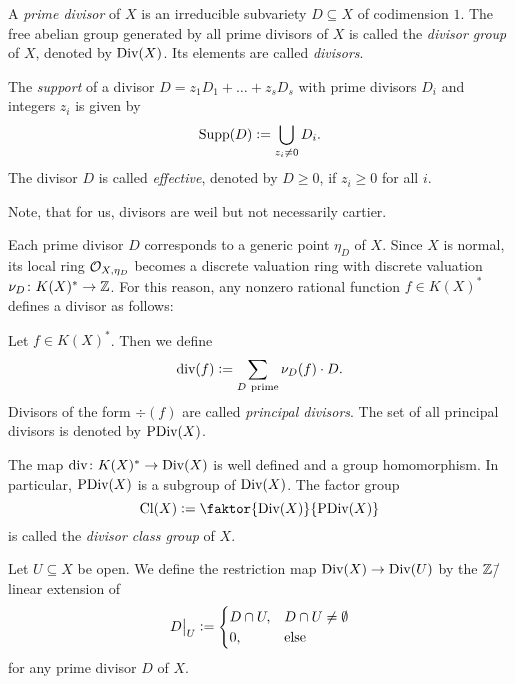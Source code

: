 \begin{defi}[Divisor]
	A \emph{prime divisor} of $X$ is an irreducible subvariety $D\subseteq X$ of codimension $1$. The free abelian group generated by all prime divisors of $X$ is called the \emph{divisor group} of $X$, denoted by $\text{Div}(X)$. Its elements are called \emph{divisors}.
	
	The \emph{support} of a divisor $D = z_1 D_1 + \dots + z_s D_s$ with prime divisors $D_i$ and integers $z_i$ is given by
	$$\text{Supp}(D) \mathrel{\mathop:}= \bigcup_{z_i \neq 0} D_i.$$
	The divisor $D$ is called \emph{effective}, denoted by $D \geq 0$, if $z_i \geq 0 $ for all $i$.
\end{defi}

Note, that for us, divisors are weil but not necessarily cartier.

Each prime divisor $D$ corresponds to a generic point $\eta_D$ of $X$. Since $X$ is normal, its local ring $\mathcal{O}_{X,\eta_D}$ becomes a discrete valuation ring with discrete valuation $\nu_D\colon K(X)^* \rightarrow \mathbb{Z}$. For this reason, any nonzero rational function $f\in K(X)^*$ defines a divisor as follows:

\begin{defi}
	Let $f\in K(X)^*$. Then we define
	$$\div(f) \defeq \sum_{D\ \text{prime}} \nu_D(f) \cdot D.$$
	Divisors of the form $\div(f)$ are called \emph{principal divisors}. The set of all principal divisors is denoted by $\text{PDiv}(X)$.
\end{defi}

\begin{remark}
	The map $\text{div}\colon K(X)^* \rightarrow \text{Div}(X)$ is well defined and a group homomorphism. In particular, $\text{PDiv}(X)$ is a subgroup of $\text{Div}(X)$. The factor group
	$$\Cl(X) \defeq \faktor{\Div(X)}{\PDiv(X)}$$
	is called the \emph{divisor class group} of $X$.
\end{remark}

\begin{defi}
	\label{defi:divisor_restriction}
	Let $U\subseteq X$ be open. We define the restriction map $\text{Div}(X) \rightarrow \text{Div}(U)$ by the $\mathbb{Z}$\=/linear extension of 
	$$D{\big |_{U}} \mathrel{\mathop:}= \begin{cases}
	D\cap U, & D\cap U \neq \emptyset \\
	0,	& \text{else}
	\end{cases}$$
	for any prime divisor $D$ of $X$.
\end{defi}

